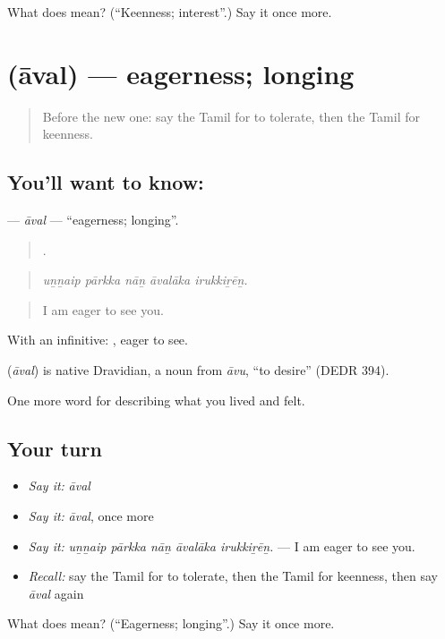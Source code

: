 \begin{tcolorbox}[breakable,colback=teal!4,colframe=teal!35!black,title={Before you move on}]
What does  mean? (\textquotedblleft{}Keenness; interest\textquotedblright{}.) Say it once more.
\end{tcolorbox}
\section[\texorpdfstring{\ta{ஆவல்} (āval)}{ஆவல் (āval)}]{ (āval) — eagerness; longing}

\label{lesson:TA-C461-aval}



\begin{quote}
Before the new one: say the Tamil for to tolerate, then the Tamil for keenness.
\end{quote}

\subsection*{You'll want to know: }
\textbf{} — \emph{āval} — \textquotedblleft{}eagerness; longing\textquotedblright{}.

\begin{quote}
    .
\end{quote}

\begin{quote}
\emph{uṉṉaip pārkka nāṉ āvalāka irukkiṟēṉ.}
\end{quote}

\begin{quote}
I am eager to see you.
\end{quote}

With an infinitive:  , eager to see.

\begin{cousinweb}
\textbf{} (\emph{āval}) is native Dravidian, a noun from  \emph{āvu}, \textquotedblleft{}to desire\textquotedblright{} (DEDR 394).
\end{cousinweb}

\begin{grammarlens}[title={What you've built}]
One more word for describing what you lived and felt.
\end{grammarlens}

\subsection*{Your turn}
\begin{itemize}
\raggedright
  \item \emph{Say it:} \emph{āval}
  \item \emph{Say it:} \emph{āval}, once more
  \item \emph{Say it:} \emph{uṉṉaip pārkka nāṉ āvalāka irukkiṟēṉ.} — I am eager to see you.
  \item \emph{Recall:} say the Tamil for to tolerate, then the Tamil for keenness, then say \emph{āval} again
\end{itemize}

\begin{tcolorbox}[breakable,colback=teal!4,colframe=teal!35!black,title={Before you move on}]
What does  mean? (\textquotedblleft{}Eagerness; longing\textquotedblright{}.) Say it once more.
\end{tcolorbox}
